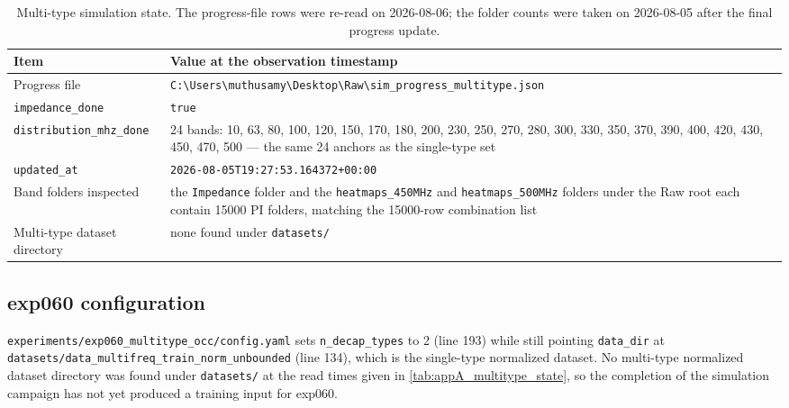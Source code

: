 \begin{table}[htbp]
\centering
\caption{Multi-type simulation state. The progress-file rows were re-read on 2026-08-06; the folder
counts were taken on 2026-08-05 after the final progress update.}
\label{tab:appA_multitype_state}
\begin{tabular}{p{} p{}}
\hline
Item & Value at the observation timestamp \\
\hline
Progress file & \texttt{C:\textbackslash{}Users\textbackslash{}muthusamy\textbackslash{}Desktop\textbackslash{}Raw\textbackslash{}sim\_progress\_multitype.json} \\
\texttt{impedance\_done} & \texttt{true} \\
\texttt{distribution\_mhz\_done} & 24 bands: 10, 63, 80, 100, 120, 150, 170, 180, 200, 230, 250,
270, 280, 300, 330, 350, 370, 390, 400, 420, 430, 450, 470, 500 --- the same 24 anchors as the
single-type set \\
\texttt{updated\_at} & \texttt{2026-08-05T19:27:53.164372+00:00} \\
Band folders inspected & the \texttt{Impedance} folder and the \texttt{heatmaps\_450MHz} and
\texttt{heatmaps\_500MHz} folders under the Raw root each contain 15000 PI folders, matching the
15000-row combination list \\
Multi-type dataset directory & none found under \texttt{datasets/} \\
\hline
\end{tabular}
\end{table}



\subsection{exp060 configuration}
\label{subsec:appA_exp060_config}

\texttt{experiments/\allowbreak{}exp060\_\allowbreak{}multitype\_\allowbreak{}occ/\allowbreak{}config.yaml} sets \texttt{n\_decap\_types} to 2 (line
193) while still pointing \texttt{data\_dir} at
\texttt{datasets/\allowbreak{}data\_\allowbreak{}multifreq\_\allowbreak{}train\_\allowbreak{}norm\_\allowbreak{}unbounded} (line 134), which is the single-type
normalized dataset. No multi-type normalized dataset directory was found under \texttt{datasets/}
at the read times given in \autoref{tab:appA_multitype_state}, so the completion of the simulation
campaign has not yet produced a training input for exp060.


